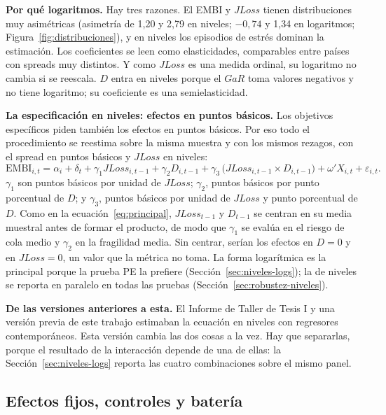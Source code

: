 \textbf{Por qué logaritmos.} Hay tres razones. El EMBI y $JLoss$ tienen distribuciones muy asimétricas (asimetría de 1,20 y 2,79 en niveles; $-0{,}74$ y 1,34 en logaritmos; Figura~\ref{fig:distribuciones}), y en niveles los episodios de estrés dominan la estimación. Los coeficientes se leen como elasticidades, comparables entre países con spreads muy distintos. Y como $JLoss$ es una medida ordinal, su logaritmo no cambia si se reescala. $D$ entra en niveles porque el $GaR$ toma valores negativos y no tiene logaritmo; su coeficiente es una semielasticidad.

\textbf{La especificación en niveles: efectos en puntos básicos.} Los objetivos específicos piden también los efectos en puntos básicos. Por eso todo el procedimiento se reestima sobre la misma muestra y con los mismos rezagos, con el spread en puntos básicos y $JLoss$ en niveles:
\begin{equation}
\mathrm{EMBI}_{i,t}=\alpha_i+\delta_t+\gamma_1 JLoss_{i,t-1}+\gamma_2 D_{i,t-1}+\gamma_3\,\bigl(JLoss_{i,t-1}\times D_{i,t-1}\bigr)+\omega'X_{i,t}+\varepsilon_{i,t}.
\label{eq:niveles}
\end{equation}
$\gamma_1$ son puntos básicos por unidad de $JLoss$; $\gamma_2$, puntos básicos por punto porcentual de $D$; y $\gamma_3$, puntos básicos por unidad de $JLoss$ y punto porcentual de $D$. Como en la ecuación~\eqref{eq:principal}, $JLoss_{t-1}$ y $D_{t-1}$ se centran en su media muestral antes de formar el producto, de modo que $\gamma_1$ se evalúa en el riesgo de cola medio y $\gamma_2$ en la fragilidad media. Sin centrar, serían los efectos en $D=0$ y en $JLoss=0$, un valor que la métrica no toma. La forma logarítmica es la principal porque la prueba PE la prefiere (Sección~\ref{sec:niveles-logs}); la de niveles se reporta en paralelo en todas las pruebas (Sección~\ref{sec:robustez-niveles}).


\textbf{De las versiones anteriores a esta.} El Informe de Taller de Tesis I y una versión previa de este trabajo estimaban la ecuación en niveles con regresores contemporáneos. Esta versión cambia las dos cosas a la vez. Hay que separarlas, porque el resultado de la interacción depende de una de ellas: la Sección~\ref{sec:niveles-logs} reporta las cuatro combinaciones sobre el mismo panel.

\subsection{Efectos fijos, controles y batería}
\label{sec:est-ef}

